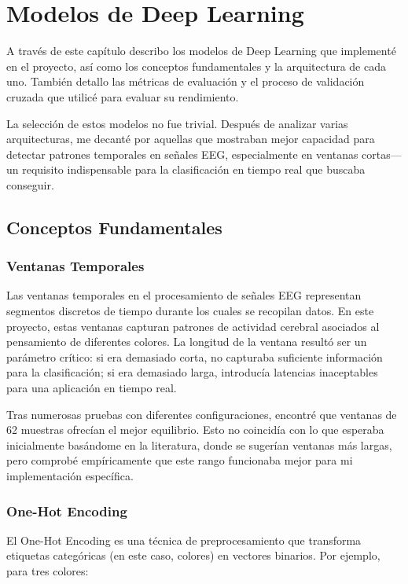 \chapter{Modelos de Deep Learning}\label{ch:deep_learning_models}

A través de este capítulo describo los modelos de Deep Learning \cite{raschka2022machine} que implementé en el proyecto, así como los conceptos fundamentales y la arquitectura de cada uno. También detallo las métricas de evaluación y el proceso de validación cruzada que utilicé para evaluar su rendimiento.

La selección de estos modelos no fue trivial. Después de analizar varias arquitecturas, me decanté por aquellas que mostraban mejor capacidad para detectar patrones temporales en señales EEG, especialmente en ventanas cortas—un requisito indispensable para la clasificación en tiempo real que buscaba conseguir.

\section{Conceptos Fundamentales}

\subsection{Ventanas Temporales}
Las ventanas temporales en el procesamiento de señales EEG representan segmentos discretos de tiempo durante los cuales se recopilan datos. En este proyecto, estas ventanas capturan patrones de actividad cerebral asociados al pensamiento de diferentes colores. La longitud de la ventana resultó ser un parámetro crítico: si era demasiado corta, no capturaba suficiente información para la clasificación; si era demasiado larga, introducía latencias inaceptables para una aplicación en tiempo real.

Tras numerosas pruebas con diferentes configuraciones, encontré que ventanas de 62 muestras ofrecían el mejor equilibrio. Esto no coincidía con lo que esperaba inicialmente basándome en la literatura, donde se sugerían ventanas más largas, pero comprobé empíricamente que este rango funcionaba mejor para mi implementación específica.

\subsection{One-Hot Encoding}
El One-Hot Encoding \cite{raschka2022machine} es una técnica de preprocesamiento que transforma etiquetas categóricas (en este caso, colores) en vectores binarios. Por ejemplo, para tres colores:

